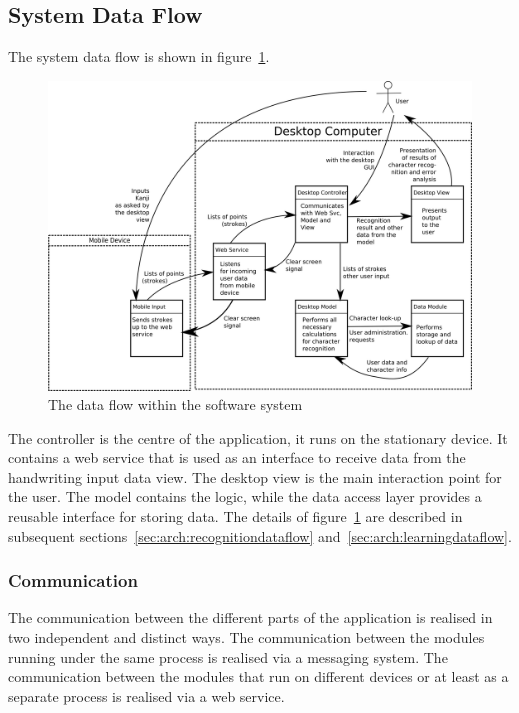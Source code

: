 \subsection{System Data Flow}
\label{sec:arch:systemdataflow}
The system data flow is shown in figure~\ref{fig:systemdataflow}.

\begin{figure}[htbp]
\begin{center}
\includegraphics[scale=0.6]{images/TechnicalDesign/SystemDataFlow.png}
\caption{The data flow within the software system}
\label{fig:systemdataflow}
\end{center}
\end{figure}
The controller is the centre of the application, it runs on the stationary
device. It contains a web service that is used as an interface to receive data 
from the handwriting input data view. The desktop view is the main interaction 
point for the user. The model contains the logic, while the data access layer 
provides a reusable interface for storing data. The details of 
figure~\ref{fig:systemdataflow} are described in subsequent 
sections~\ref{sec:arch:recognitiondataflow} and~\ref{sec:arch:learningdataflow}.

\subsubsection{Communication}
\label{sec:arch:communication}

The communication between the different parts of the application is realised 
in two independent and distinct ways. The communication between the 
modules running under the same process is realised via a messaging system. 
The communication between the modules that run on different devices
or at least as a separate process is realised via a web service.

